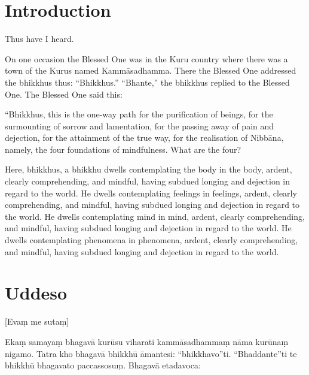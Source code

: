 \newcommand\englishPage{%
  \clearpage%
  \englishText%
}

\newcommand\paliPage{%
  \clearpage%
  \paliText%
}

\renewcommand{\englishTitle}{The Foundations of Mindfulness}
\renewcommand{\paliTitle}{Mahāsatipaṭṭhāna Sutta}

\englishPage
\chapter{Introduction}

Thus have I heard.

On one occasion the Blessed One was in the Kuru country where there was a town
of the Kurus named Kammāsadhamma. There the Blessed One addressed the bhikkhus
thus: “Bhikkhus.” “Bhante,” the bhikkhus replied to the Blessed One. The Blessed
One said this:

“Bhikkhus, this is the one-way path for the purification of beings, for the
surmounting of sorrow and lamentation, for the passing away of pain and
dejection, for the attainment of the true way, for the realisation of Nibbāna,
namely, the four foundations of mindfulness. What are the four?

Here, bhikkhus, a bhikkhu dwells contemplating the body in the body, ardent,
clearly comprehending, and mindful, having subdued longing and dejection in
regard to the world. He dwells contemplating feelings in feelings, ardent,
clearly comprehending, and mindful, having subdued longing and dejection in
regard to the world. He dwells contemplating mind in mind, ardent, clearly
comprehending, and mindful, having subdued longing and dejection in regard to
the world. He dwells contemplating phenomena in phenomena, ardent, clearly
comprehending, and mindful, having subdued longing and dejection in regard to
the world.


\paliPage
\chapter*{Uddeso}

[Evaṃ me sutaṃ]

Ekaṃ samayaṃ bhagavā kurūsu viharati kammāsadhammaṃ nāma kurūnaṃ nigamo. Tatra
kho bhagavā bhikkhū āmantesi: “bhikkhavo”ti. “Bhaddante”ti te bhikkhū bhagavato
paccassosuṃ. Bhagavā etadavoca:

